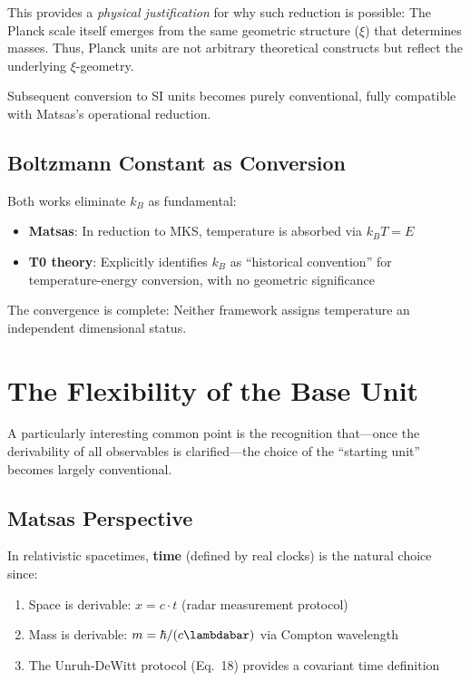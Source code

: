 	This provides a \emph{physical justification} for why such reduction is possible: The Planck scale itself emerges from the same geometric structure ($\xi$) that determines masses. Thus, Planck units are not arbitrary theoretical constructs but reflect the underlying $\xi$-geometry.
	
	Subsequent conversion to SI units becomes purely conventional, fully compatible with Matsas's operational reduction.
	
	\subsection{Boltzmann Constant as Conversion}
	
	Both works eliminate $k_B$ as fundamental:
	
	\begin{itemize}
		\item \textbf{Matsas}: In reduction to MKS, temperature is absorbed via $k_B T = E$
		\item \textbf{T0 theory}: Explicitly identifies $k_B$ as ``historical convention'' for temperature-energy conversion, with no geometric significance
	\end{itemize}
	
	The convergence is complete: Neither framework assigns temperature an independent dimensional status.
	
	\section{The Flexibility of the Base Unit}
	
	A particularly interesting common point is the recognition that—once the derivability of all observables is clarified—the choice of the ``starting unit'' becomes largely conventional.
	
	\subsection{Matsas Perspective}
	
	In relativistic spacetimes, \textbf{time} (defined by real clocks) is the natural choice since:
	\begin{enumerate}
		\item Space is derivable: $x = c \cdot t$ (radar measurement protocol)
		\item Mass is derivable: $m = \hbar / (c \lambdabar)$ via Compton wavelength
		\item The Unruh-DeWitt protocol (Eq.~18) provides a covariant time definition
	\end{enumerate}
	
